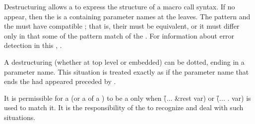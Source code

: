 Destructuring allows a  to express
the structure of a macro call syntax.
If no  appear,
then the  is a 
containing parameter names at the leaves.
The pattern and the  must have compatible ; 
that is, their  must be equivalent,
or it must differ only in that some  of the pattern
match   of the .
For information about error detection in this ,
\seesection\DestructuringMismatch.


A destructuring 
(whether at top level or embedded) 
can
be dotted, ending
in a parameter name.  This situation is treated exactly as if the
parameter name that ends the  had appeared preceded by .


It is permissible for a   (or a  of a
 )
to be a  
only  when \f{(... \&rest var)} or \f{(... . var)} is used to match
 it. It is the responsibility of the  to recognize and deal
 with such situations.

